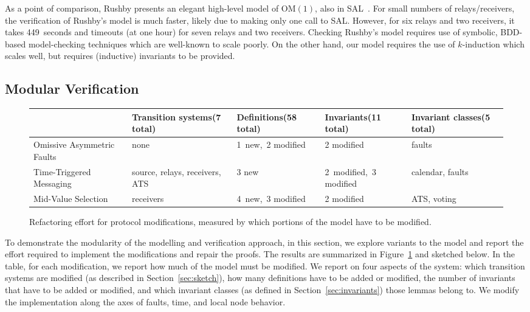 \documentclass{llncs/llncs}
\newcommand{\OM}[1]{\ensuremath{\mathrm{OM}(#1)}\xspace}
\begin{document}
{As a point of comparison, Rushby presents an elegant high-level model of
\OM{1}, also in SAL~\cite{Rushby:OM1}. For small numbers of relays/receivers,
the verification of Rushby's model is much faster, likely due to making only
one call to SAL. However, for six relays and two receivers, it takes
449~seconds and timeouts (at one hour) for seven relays and two receivers.
Checking Rushby's model requires use of symbolic, BDD-based model-checking
techniques which are well-known to scale poorly. On the other hand, our model
requires the use of $k$-induction which scales well, but requires (inductive)
invariants to be provided.


\subsection{Modular Verification}\label{sec:modular}

\begin{figure}
  \centering
  \begin{tabular}{|p{3cm}|p{2cm}|p{2cm}|p{2cm}|p{2cm}|}
  \hline
                                  & Transition systems\linebreak (7 total)  &Definitions\linebreak (58 total) & Invariants\linebreak (11 total) & Invariant classes\linebreak (5 total) \\
  \hline \hline
Omissive \mbox{Asymmetric} Faults       & none      & \mbox{1 new, 2} \mbox{modified} & 2 modified & faults             \\
  \hline
Time-Triggered \mbox{Messaging}        & source, relays, receivers, ATS & 3 new & \mbox{2 modified, 3} \mbox{modified} & calendar, faults \\
  \hline
Mid-Value Selection & receivers & \mbox{4 new, 3} \mbox{modified} & 2 modified & ATS, voting \\
  \hline
  \end{tabular}
  \caption{Refactoring effort for protocol modifications, measured by which portions of the model have to be modified.}
  \label{fig:effort}
\end{figure}

To demonstrate the modularity of the modelling and verification approach, in this section, we explore variants to the model and report the effort required to implement the modifications and repair the proofs. The results are summarized in Figure~\ref{fig:effort} and sketched below. In the table, for each modification, we report how much of the model must be modified. We report on four aspects of the system: which transition systems are modified (as described in Section~\ref{sec:sketch}), how many definitions have to be added or modified, the number of invariants that have to be added or modified, and which invariant classes (as defined in Section~\ref{sec:invariants}) those lemmas belong to. We modify the implementation along the axes of faults, time, and local node behavior.

}
\end{document}
